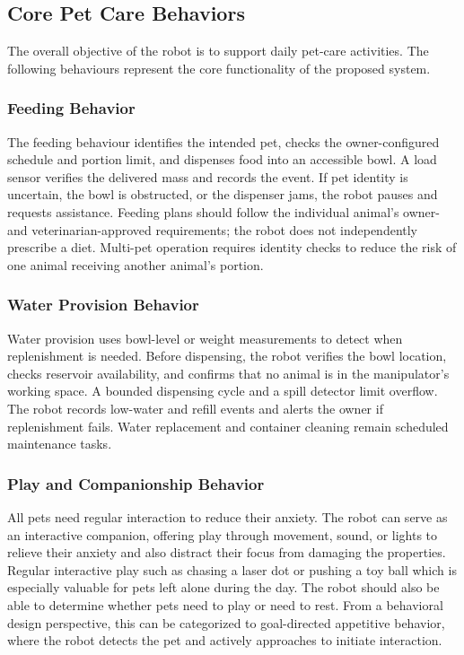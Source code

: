 \documentclass[conference,letterpaper]{IEEEtran}
\begin{document}
\subsection{Core Pet Care Behaviors}

The overall objective of the robot is to support daily pet-care activities. The following behaviours represent the core functionality of the proposed system.

\subsubsection{Feeding Behavior}

The feeding behaviour identifies the intended pet, checks the owner-configured schedule and portion limit, and dispenses food into an accessible bowl. A load sensor verifies the delivered mass and records the event. If pet identity is uncertain, the bowl is obstructed, or the dispenser jams, the robot pauses and requests assistance. Feeding plans should follow the individual animal's owner- and veterinarian-approved requirements; the robot does not independently prescribe a diet. Multi-pet operation requires identity checks to reduce the risk of one animal receiving another animal's portion.

\subsubsection{Water Provision Behavior}

Water provision uses bowl-level or weight measurements to detect when replenishment is needed. Before dispensing, the robot verifies the bowl location, checks reservoir availability, and confirms that no animal is in the manipulator's working space. A bounded dispensing cycle and a spill detector limit overflow. The robot records low-water and refill events and alerts the owner if replenishment fails. Water replacement and container cleaning remain scheduled maintenance tasks.

\subsubsection{Play and Companionship Behavior}

All pets need regular interaction to reduce their anxiety. The robot can serve as an interactive companion, offering play through movement, sound, or lights to relieve their anxiety and also distract their focus from damaging the properties. Regular interactive play such as chasing a laser dot or pushing a toy ball which is especially valuable for pets left alone during the day. The robot should also be able to determine whether pets need to play or need to rest. From a behavioral design perspective, this can be categorized to goal-directed appetitive behavior, where the robot detects the pet and actively approaches to initiate interaction.
\end{document}
